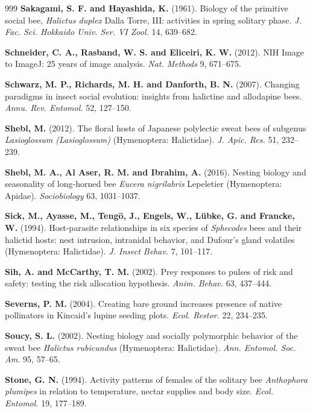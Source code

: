 \documentclass[11pt,a4paper]{article}
\begin{document}
\begin{thebibliography}{999}
\textbf{Sakagami, S. F. and Hayashida, K.} (1961).
Biology of the primitive social bee, \textit{Halictus duplex} Dalla Torre, III: activities in spring solitary phase.
\textit{J. Fac. Sci. Hokkaido Univ. Ser. VI Zool.} 14, 639--682.

\textbf{Schneider, C. A., Rasband, W. S. and Eliceiri, K. W.} (2012). NIH Image to ImageJ: 25 years of image analysis. \textit{Nat. Methods} 9, 671--675.

\textbf{Schwarz, M. P., Richards, M. H. and Danforth, B. N.} (2007). Changing paradigms in insect social evolution: insights from halictine and allodapine bees. \textit{Annu. Rev. Entomol.} 52, 127--150.

\textbf{Shebl, M.} (2012). The floral hosts of Japanese polylectic sweat bees of subgenus \textit{Lasioglossum (Lasioglossum)} (Hymenoptera: Halictidae). \textit{J. Apic. Res.} 51, 232--239.

\textbf{Shebl, M. A., Al Aser, R. M. and Ibrahim, A.} (2016).
Nesting biology and seasonality of long-horned bee \textit{Eucera nigrilabris} Lepeletier (Hymenoptera: Apidae).
\textit{Sociobiology} 63, 1031--1037.

\textbf{Sick, M., Ayasse, M., Teng{\"o}, J., Engels, W., L{\"u}bke, G. and Francke, W.} (1994).
Host-parasite relationships in six species of \textit{Sphecodes} bees and their halictid hosts: nest intrusion, intranidal behavior, and Dufour's gland volatiles (Hymenoptera: Halictidae).
\textit{J. Insect Behav.} 7, 101--117.

\textbf{Sih, A. and McCarthy, T. M.} (2002).
Prey responses to pulses of risk and safety: testing the risk allocation hypothesis.
\textit{Anim. Behav.} 63, 437--444.

\textbf{Severns, P. M.} (2004).
Creating bare ground increases presence of native pollinators in Kincaid’s lupine seeding plots.
\textit{Ecol. Restor.} 22, 234--235.

\textbf{Soucy, S. L.} (2002). Nesting biology and socially polymorphic behavior of the sweat bee \textit{Halictus rubicundus} (Hymenoptera: Halictidae). \textit{Ann. Entomol. Soc. Am.} 95, 57--65.

\textbf{Stone, G. N.} (1994).
Activity patterns of females of the solitary bee \textit{Anthophora plumipes} in relation to temperature, nectar supplies and body size.
\textit{Ecol. Entomol.} 19, 177--189.


\end{thebibliography}
\end{document}
